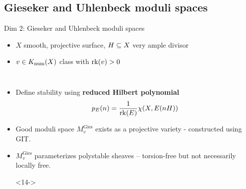 \documentclass[8pt]{beamer} %
\begin{document}
\subsection{Gieseker and Uhlenbeck moduli spaces}
\begin{frame}[fragile]{Dim 2: Gieseker and Uhlenbeck moduli spaces}
    \begin{itemize}
        \item<2->[] $X$ smooth, projective surface, $H \subseteq X$ very ample divisor
        \item<3->[] $v \in K_{\mathrm{num}}(X)$ class with $\operatorname{\mathrm{rk}}(v) > 0$
        \item[]
    \end{itemize}
    
    \begin{columns}[t]
        \begin{itemize}
            \item<5-> Define stability using \textbf{reduced Hilbert polynomial}
            \[ p_E(n) = \frac{1}{\operatorname{\mathrm{rk}}(E)} \chi(X, E(n H)) \]
            \item<6-> Good moduli space $M^{\text{Gies}}_v$ exists as a projective variety - constructed using GIT.
            \item<7-> $M^{\text{Gies}}_v$ parameterizes polystable sheaves -- torsion-free but not necessarily locally free.
            \item[]
            \item[]<14->
            \begin{center}
            \end{center}
        \end{itemize}
        

\end{columns}
\end{frame}
\end{document}
